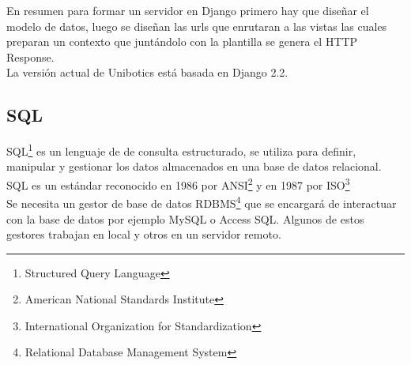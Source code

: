 En resumen para formar un servidor en Django primero hay que diseñar el modelo de datos, luego se diseñan las urls que enrutaran a las vistas las cuales preparan un contexto que juntándolo con la plantilla se genera el HTTP Response.\\

La versión actual de Unibotics está basada en Django 2.2.

\subsection{SQL}
SQL\footnote{Structured Query Language} es un lenguaje de de consulta estructurado, se utiliza para definir, manipular y gestionar los datos almacenados en una base de datos relacional. SQL es un estándar reconocido en 1986 por ANSI\footnote{American National Standards Institute} y en 1987 por ISO\footnote{International Organization for Standardization}\\

Se necesita un gestor de base de datos RDBMS\footnote{Relational Database Management System}  que se encargará de interactuar con la base de datos por ejemplo MySQL o  Access SQL. Algunos de estos gestores trabajan en local y otros en un servidor remoto.\cite{rdbms}\\

